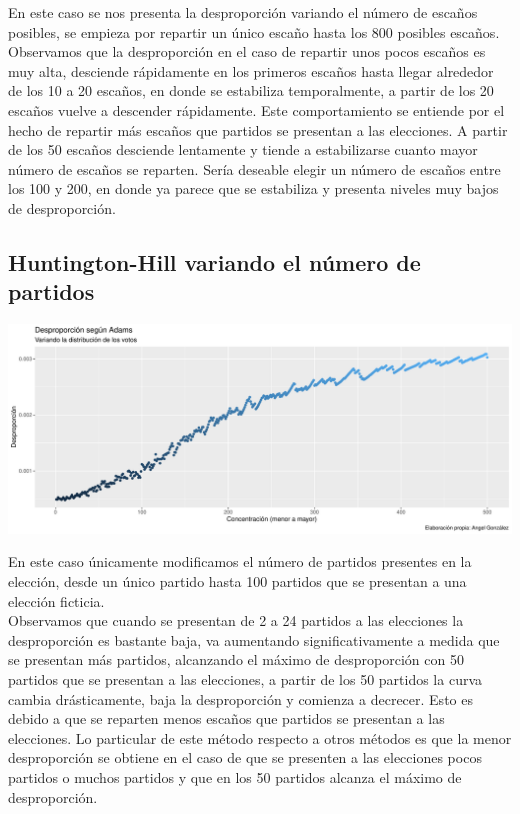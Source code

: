 \documentclass[12pt,a4paper,]{book}
\numberwithin{dummy}{section}
\theoremstyle{ocrenumbox}
\theoremstyle{blacknumex}
\theoremstyle{blacknumbox}
\theoremstyle{ocrenum}
\theoremstyle{ocrenum}
\begin{document}
En este caso se nos presenta la desproporción variando el número de
escaños posibles, se empieza por repartir un único escaño hasta los 800
posibles escaños. Observamos que la desproporción en el caso de repartir
unos pocos escaños es muy alta, desciende rápidamente en los primeros
escaños hasta llegar alrededor de los 10 a 20 escaños, en donde se
estabiliza temporalmente, a partir de los 20 escaños vuelve a descender
rápidamente. Este comportamiento se entiende por el hecho de repartir
más escaños que partidos se presentan a las elecciones. A partir de los
50 escaños desciende lentamente y tiende a estabilizarse cuanto mayor
número de escaños se reparten. Sería deseable elegir un número de
escaños entre los 100 y 200, en donde ya parece que se estabiliza y
presenta niveles muy bajos de desproporción.

\hypertarget{huntington-hill-variando-el-nuxfamero-de-partidos}{%
\subsection{Huntington-Hill variando el número de
partidos}\label{huntington-hill-variando-el-nuxfamero-de-partidos}}

\begin{center}\includegraphics[width=0.95\linewidth]{figurasR/unnamed-chunk-39-1} \end{center}

En este caso únicamente modificamos el número de partidos presentes en
la elección, desde un único partido hasta 100 partidos que se presentan
a una elección ficticia.\\
Observamos que cuando se presentan de 2 a 24 partidos a las elecciones
la desproporción es bastante baja, va aumentando significativamente a
medida que se presentan más partidos, alcanzando el máximo de
desproporción con 50 partidos que se presentan a las elecciones, a
partir de los 50 partidos la curva cambia drásticamente, baja la
desproporción y comienza a decrecer. Esto es debido a que se reparten
menos escaños que partidos se presentan a las elecciones. Lo particular
de este método respecto a otros métodos es que la menor desproporción se
obtiene en el caso de que se presenten a las elecciones pocos partidos o
muchos partidos y que en los 50 partidos alcanza el máximo de
desproporción.
\end{document}
